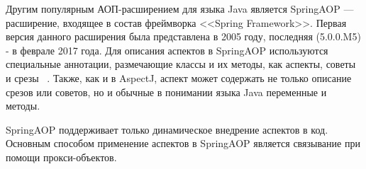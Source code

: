 \documentclass[conference]{IEEEtran}
\begin{document}
Другим популярным АОП-расширением для языка Java является SpringAOP ---
расширение, входящее в состав фреймворка <<Spring Framework>>.
Первая версия данного расширения была представлена в 2005 году, последняя
 (5.0.0.M5) - в феврале 2017 года.
Для описания аспектов в SpringAOP используются специальные аннотации,
размечающие классы и их методы, как аспекты, советы и срезы
~\cite{springAOP_doc}.
Также, как и в AspectJ, аспект может содержать не только описание срезов или
советов, но и обычные в понимании языка Java переменные и методы.


SpringAOP поддерживает только динамическое внедрение аспектов в код.
Основным способом применение аспектов в SpringAOP является связывание при
помощи прокси-объектов.
\end{document}
